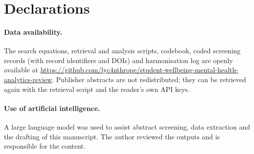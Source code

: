 \documentclass[11pt,a4paper]{article}
\begin{document}
\section*{Declarations}

\paragraph{Data availability.} The search equations, retrieval and analysis scripts, codebook, coded screening records (with record identifiers and DOIs) and harmonisation log are openly available at \url{https://github.com/lyc4nthrope/student-wellbeing-mental-health-analytics-review}. Publisher abstracts are not redistributed; they can be retrieved again with the retrieval script and the reader's own API keys.

\paragraph{Use of artificial intelligence.} A large language model was used to assist abstract screening, data extraction and the drafting of this manuscript. The author reviewed the outputs and is responsible for the content.



\end{document}

